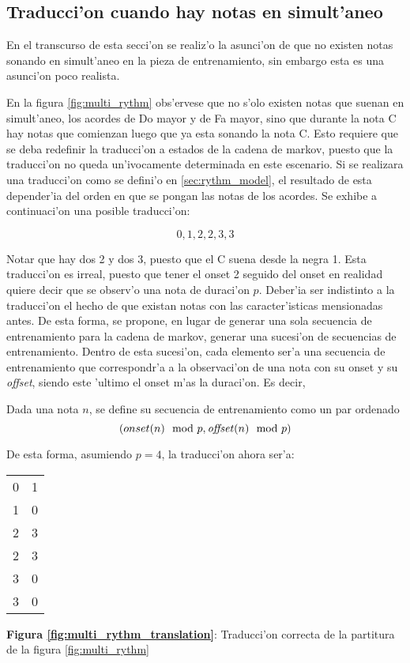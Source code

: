 \subsection{Traducci'on cuando hay notas en simult'aneo}
En el transcurso de esta secci'on se realiz'o la asunci'on de que no existen notas sonando en simult'aneo en la pieza de entrenamiento, sin embargo esta es una asunci'on poco
realista.


\begin{imagen}
\end{imagen}

En la figura \ref{fig:multi_rythm} obs'ervese que no s'olo existen notas que suenan en simult'aneo, los acordes de Do mayor y de Fa mayor, 
sino que durante la nota C hay notas que comienzan luego que ya esta sonando la nota C. Esto requiere que se deba redefinir la traducci'on
a estados de la cadena de markov, puesto que la traducci'on no queda un'ivocamente determinada en este escenario.
Si se realizara una traducci'on como se defini'o en \ref{sec:rythm_model}, el resultado de esta depender'ia del orden en que se pongan
las notas de los acordes. Se exhibe a continuaci'on una posible traducci'on:

$$0, 1, 2, 2, 3, 3$$

Notar que hay dos 2 y dos 3, puesto que el C suena desde la negra 1. Esta traducci'on es irreal, puesto que tener el onset 2 seguido del onset 
en realidad quiere decir que se observ'o una nota de duraci'on $p$. Deber'ia ser indistinto a la traducci'on el hecho de que existan notas 
con las caracter'isticas mensionadas antes. De esta forma, se propone, en lugar de generar una sola secuencia de entrenamiento para la cadena
de markov, generar una sucesi'on de secuencias de entrenamiento. Dentro de esta sucesi'on, cada elemento ser'a una secuencia de entrenamiento
que correspondr'a a la observaci'on de una nota con su onset y su \emph{offset}, siendo este 'ultimo el onset m'as la duraci'on. Es decir, 

\begin{definition}
Dada una nota $n$, se define su secuencia de entrenamiento como un par ordenado $$(onset(n) \mod p, \text{\emph{offset}}(n)\mod p)$$
\end{definition}

De esta forma, asumiendo $p=4$, la traducci'on ahora ser'a:
\begin{center}
\begin{tabular}{c c} 
\label{fig:multi_rythm_translation}
0 & 1 \\
1 & 0 \\
2 & 3 \\
2 & 3 \\
3 & 0 \\
3 & 0 \\
\end{tabular}
\newline
\textbf{Figura \ref{fig:multi_rythm_translation}}: Traducci'on correcta de la partitura de la figura \ref{fig:multi_rythm}

\end{center}

